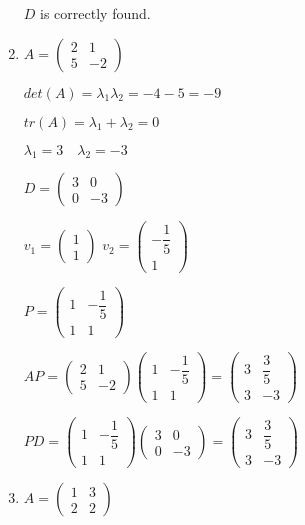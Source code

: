 \documentclass[12pt,letterpaper]{article}
\begin{document}
\begin{enumerate}[label=(\alph*)]
        $D$ is correctly found.
    \item
        $A = \begin{pmatrix} 
            2 & 1 \\ 
            5 & -2 
        \end{pmatrix}$
        
        $det(A) = \lambda_1\lambda_2 = -4 - 5 = -9$
        
        $tr(A) = \lambda_1+\lambda_2 = 0$
        
        $\lambda_1 = 3\quad \lambda_2 = -3$
        
        $D = \begin{pmatrix} 
            3 & 0 \\ 
            0 & -3 
        \end{pmatrix}$
        
        $v_1 = \begin{pmatrix} 1 \\ 1 \end{pmatrix}$
        \quad
        $v_2 = \begin{pmatrix} -\dfrac{1}{5} \\ 1 \end{pmatrix}$
        
        $P = \begin{pmatrix} 
            1 & -\dfrac{1}{5} \\ 
            1 & 1 
        \end{pmatrix}$
        
        $AP = \begin{pmatrix}
            2 & 1 \\ 
            5 & -2
        \end{pmatrix}
        \begin{pmatrix} 
            1 & -\dfrac{1}{5} \\ 
            1 & 1 
        \end{pmatrix} = 
        \begin{pmatrix}
            3 & \dfrac{3}{5} \\ 
            3 & -3
        \end{pmatrix}$
        
        $PD = 
        \begin{pmatrix} 
            1 & -\dfrac{1}{5} \\ 
            1 & 1 
        \end{pmatrix}
        \begin{pmatrix} 
            3 & 0 \\ 
            0 & -3
        \end{pmatrix} = 
        \begin{pmatrix}
            3 & \dfrac{3}{5} \\ 
            3 & -3
        \end{pmatrix}$
    \item
        $A = \begin{pmatrix}
            1 & 3 \\
            2 & 2
        \end{pmatrix}$
        

\end{enumerate}
\end{document}
